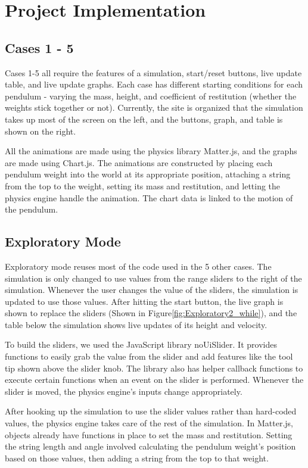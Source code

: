 \documentclass[onecolumn, draftclsnofoot,10pt, compsoc]{IEEEtran}
\begin{document}
\section{Project Implementation}
\subsection{Cases 1 - 5}

Cases 1-5 all require the features of a simulation, start/reset buttons, live update table, and live update graphs. Each case has different starting conditions for each pendulum - varying the mass, height, and coefficient of restitution (whether the weights stick together or not). Currently, the site is organized that the simulation takes up most of the screen on the left, and the buttons, graph, and table is shown on the right. 

\noindent 
All the animations are made using the physics library Matter.js, and the graphs are made using Chart.js. The animations are constructed by placing each pendulum weight into the world at its appropriate position, attaching a string from the top to the weight, setting its mass and restitution, and letting the physics engine handle the animation. The chart data is linked to the motion of the pendulum. 

\subsection{Exploratory Mode}
Exploratory mode reuses most of the code used in the 5 other cases. The simulation is only changed to use values from the range sliders to the right of the simulation. Whenever the user changes the value of the sliders, the simulation is updated to use those values. After hitting the start button, the live graph is shown to replace the sliders (Shown in Figure\ref{fig:Exploratory2_while}), and the table below the simulation shows live updates of its height and velocity.  

\noindent 
To build the sliders, we used the JavaScript library noUiSlider. It provides functions to easily grab the value from the slider and add features like the tool tip shown above the slider knob. 
The library also has helper callback functions to execute certain functions when an event on the slider is performed. Whenever the slider is moved, the physics engine's inputs change appropriately.

\noindent 
After hooking up the simulation to use the slider values rather than hard-coded values, the physics engine takes care of the rest of the simulation. In Matter.js, objects already have functions in place to set the mass and restitution. Setting the string length and angle involved calculating the pendulum weight's position based on those values, then adding a string from the top to that weight. 
\end{document}
